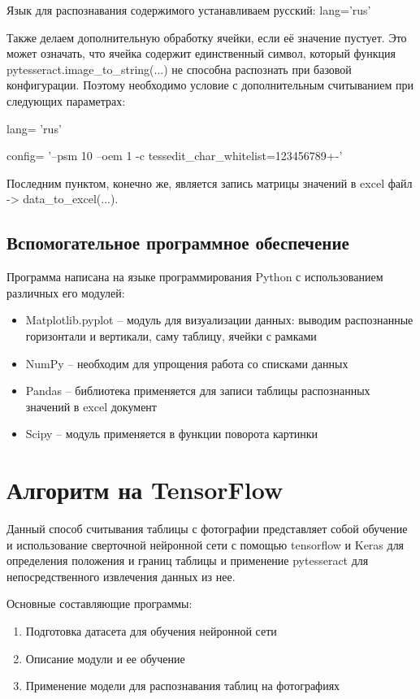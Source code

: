 \documentclass[a4paper, 12pt]{report}
\begin{document}
Язык для распознавания содержимого устанавливаем русский: lang='rus'

Также делаем дополнительную обработку ячейки, если её значение пустует. Это может означать, что ячейка содержит единственный символ, который функция pytesseract.image\_to\_string(...) не способна распознать при базовой конфигурации. Поэтому необходимо условие с дополнительным считыванием при следующих параметрах:

lang= 'rus'

config= '--psm 10 --oem 1 -c tessedit\_char\_whitelist=123456789+-'

Последним пунктом, конечно же, является запись матрицы значений в excel файл -> data\_to\_excel(...).

\subsection*{Вспомогательное программное обеспечение}
Программа написана на языке программирования Python с использованием различных его модулей:
\begin{itemize}
    \item Matplotlib.pyplot – модуль для визуализации данных: выводим распознанные горизонтали и вертикали, саму таблицу, ячейки с рамками
    \item NumPy – необходим для упрощения работа со списками данных
    \item Pandas – библиотека применяется для записи таблицы распознанных значений в excel документ
    \item Scipy – модуль применяется в функции поворота картинки
\end{itemize}

\pagebreak
\section{Алгоритм на TensorFlow}
Данный способ считывания таблицы с фотографии представляет собой обучение и использование сверточной нейронной сети с помощью tensorflow и Keras для определения положения и границ таблицы и применение pytesseract для непосредственного извлечения данных из нее.

Основные составляющие программы:
\begin{enumerate}
    \item Подготовка датасета для обучения нейронной сети
    \item Описание модули и ее обучение
    \item Применение модели для распознавания таблиц на фотографиях
\end{enumerate}
\end{document}
